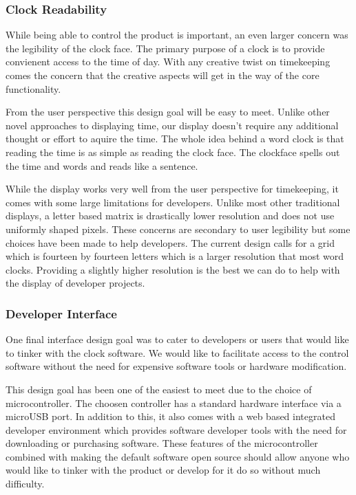 \documentclass[10pt,draftclsnofoot,onecolumn]{IEEEtran}
\begin{document}
\subsubsection{Clock Readability}

\hfill \break \indent While being able to control the product is important, an even larger concern was the legibility of the clock face.
The primary purpose of a clock is to provide convienent access to the time of day.
With any creative twist on timekeeping comes the concern that the creative aspects will get in the way of the core functionality.

\hfill \break \indent From the user perspective this design goal will be easy to meet.
Unlike other novel approaches to displaying time, our display doesn't require any additional thought or effort to aquire the time.
The whole idea behind a word clock is that reading the time is as simple as reading the clock face.
The clockface spells out the time and words and reads like a sentence.

\hfill \break \indent While the display works very well from the user perspective for timekeeping, it comes with some large limitations for developers.
Unlike most other traditional displays, a letter based matrix is drastically lower resolution and does not use uniformly shaped pixels.
These concerns are secondary to user legibility but some choices have been made to help developers.
The current design calls for a grid which is fourteen by fourteen letters which is a larger resolution that most word clocks.
Providing a slightly higher resolution is the best we can do to help with the display of developer projects.

\subsubsection{Developer Interface}

\hfill \break \indent 
One final interface design goal was to cater to developers or users that would like to tinker with the clock software.
We would like to facilitate access to the control software without the need for expensive software tools or hardware modification.

\hfill \break \indent 
This design goal has been one of the easiest to meet due to the choice of microcontroller.
The choosen controller has a standard hardware interface via a microUSB port.
In addition to this, it also comes with a web based integrated developer environment which provides software developer tools with the need for downloading or purchasing software.
These features of the microcontroller combined with making the default software open source should allow anyone who would like to tinker with the product or develop for it do so without much difficulty.
\end{document}
